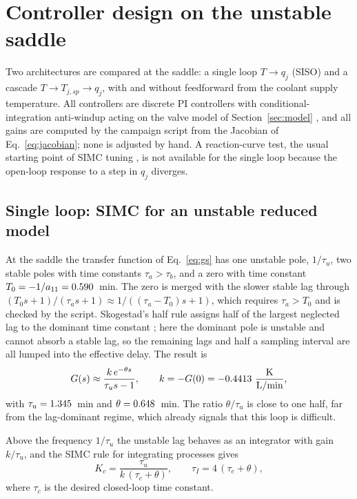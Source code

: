 \section{Controller design on the unstable saddle}
\label{sec:design}

Two architectures are compared at the saddle: a single loop $T\rightarrow q_j$ (SISO) and a cascade $T\rightarrow T_{j,sp}\rightarrow q_j$, with and without feedforward from the coolant supply temperature. All controllers are discrete PI controllers with conditional-integration anti-windup acting on the valve model of Section~\ref{sec:model} \cite{astrom2006pid,astrom1995pid,odwyer2009handbook,tarbouriech2009antiwindup}, and all gains are computed by the campaign script from the Jacobian of Eq.~\eqref{eq:jacobian}; none is adjusted by hand. A reaction-curve test, the usual starting point of SIMC tuning \cite{skogestad2003simple,grimholt2018optimal}, is not available for the single loop because the open-loop response to a step in $q_j$ diverges.

\subsection{Single loop: SIMC for an unstable reduced model}
\label{subsec:siso_design}
At the saddle the transfer function of Eq.~\eqref{eq:gs} has one unstable pole, $1/\tau_u$, two stable poles with time constants $\tau_a>\tau_b$, and a zero with time constant $T_0=-1/a_{11}=0.590$~min. The zero is merged with the slower stable lag through $(T_0s+1)/(\tau_as+1)\approx 1/((\tau_a-T_0)s+1)$, which requires $\tau_a>T_0$ and is checked by the script. Skogestad's half rule assigns half of the largest neglected lag to the dominant time constant \cite{skogestad2003simple,rivera1986internal}; here the dominant pole is unstable and cannot absorb a stable lag, so the remaining lags and half a sampling interval are all lumped into the effective delay. The result is
\begin{equation}
G(s)\approx \frac{k\,e^{-\theta s}}{\tau_us-1},\qquad k=-G(0)=-0.4413~\frac{\text{K}}{\text{L/min}},
\label{eq:unstable_model}
\end{equation}
with $\tau_u=1.345$~min and $\theta=0.648$~min. The ratio $\theta/\tau_u$ is close to one half, far from the lag-dominant regime, which already signals that this loop is difficult.

Above the frequency $1/\tau_u$ the unstable lag behaves as an integrator with gain $k/\tau_u$, and the SIMC rule for integrating processes \cite{skogestad2003simple,alcantara2013pid} gives
\begin{equation}
K_c=\frac{\tau_u}{k\,(\tau_c+\theta)},\qquad \tau_I=4\,(\tau_c+\theta),
\label{eq:simc_unstable}
\end{equation}
where $\tau_c$ is the desired closed-loop time constant.

